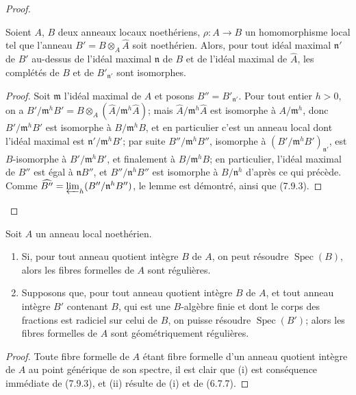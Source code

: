 \begin{proof}
\begin{lemma}[7.9.3.1]
\label{IV.2.s7.9.3.1-fr}
Soient $A$, $B$ deux anneaux locaux noethériens,
$\rho:A\to B$ un homomorphisme local tel que l'anneau
$B'=B\otimes_A\widehat A$ soit noethérien. Alors, pour tout idéal maximal
$\mathfrak n'$ de $B'$ au-dessus de l'idéal maximal $\mathfrak n$ de $B$ et
de l'idéal maximal de $\widehat A$, les complétés de $B$ et de
$B'_{\mathfrak n'}$ sont isomorphes.
\end{lemma}

\begin{proof}
Soit $\mathfrak m$ l'idéal maximal de $A$ et posons
$B''=B'_{\mathfrak n'}$. Pour tout entier $h>0$, on a
$B'/\mathfrak m^hB'=B\otimes_A(\widehat A/\mathfrak m^h\widehat A)$; mais
$\widehat A/\mathfrak m^h\widehat A$ est isomorphe à
$A/\mathfrak m^h$, donc $B'/\mathfrak m^hB'$ est isomorphe à
$B/\mathfrak m^hB$, et en particulier c'est un anneau local dont l'idéal
maximal est $\mathfrak n'/\mathfrak m^hB'$; par suite
$B''/\mathfrak m^hB''$, isomorphe à
$(B'/\mathfrak m^hB')_{\mathfrak n'}$, est $B$-isomorphe à
$B'/\mathfrak m^hB'$, et finalement à $B/\mathfrak m^hB$; en particulier,
l'idéal maximal de $B''$ est égal à $\mathfrak nB''$, et
$B''/\mathfrak n^hB''$ est isomorphe à $B/\mathfrak n^h$ d'après ce qui
précède. Comme
$\widehat{B''}=\varprojlim_h(B''/\mathfrak n^hB'')$, le lemme est démontré,
ainsi que (7.9.3).
\end{proof}
\end{proof}

\begin{corollary}[7.9.4]
\label{IV.2.s7.9.4-fr}
Soit $A$ un anneau local noethérien.
\begin{enumerate}
\item[\emph{(i)}] Si, pour tout anneau quotient intègre $B$ de $A$, on peut
résoudre $\operatorname{Spec}(B)$, alors les fibres formelles de $A$ sont
régulières.
\item[\emph{(ii)}] Supposons que, pour tout anneau quotient intègre $B$ de
$A$, et tout anneau intègre $B'$ contenant $B$, qui est une $B$-algèbre finie
et dont le corps des fractions est radiciel sur celui de $B$, on puisse
résoudre $\operatorname{Spec}(B')$; alors les fibres formelles de $A$ sont
géométriquement régulières.
\end{enumerate}
\end{corollary}

\begin{proof}
Toute fibre formelle de $A$ étant fibre formelle d'un anneau quotient intègre
de $A$ au point générique de son spectre, il est clair que (i) est conséquence
immédiate de (7.9.3), et (ii) résulte de (i) et de (6.7.7).
\end{proof}

